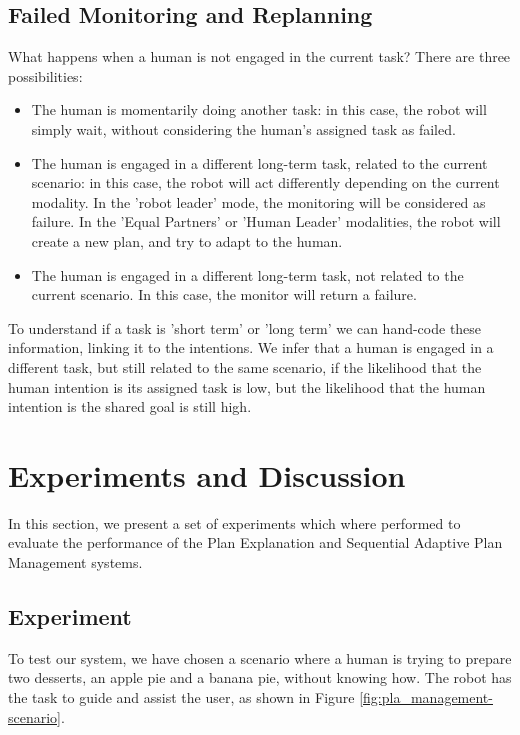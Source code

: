 \subsection{Failed Monitoring and Replanning}
What happens when a human is not engaged in the current task? There are three possibilities:
\begin{itemize}
\item The human is momentarily doing another task: in this case, the robot will simply wait, without considering the human's assigned task as failed.
\item The human is engaged in a different long-term task, related to the current scenario: in this case, the robot will act differently depending on the current modality. In the 'robot leader' mode, the monitoring will be considered as failure. In the 'Equal Partners' or 'Human Leader' modalities, the robot will create a new plan, and try to adapt to the human.  
\item The human is engaged in a different long-term task, not related to the current scenario. In this case, the monitor will return a failure.
\end{itemize}

To understand if a task is 'short term' or 'long term' we can hand-code these information, linking it to the intentions. We infer that a human is engaged in a different task, but still related to the same scenario, if the likelihood that the human intention is its assigned task is low, but the likelihood that the human intention is the shared goal is still high. 



\section{Experiments and Discussion}
\label{sec:plan_management-experiments}
In this section, we present a set of experiments which where performed to evaluate the performance of the Plan Explanation and Sequential Adaptive Plan Management systems.

 \subsection{Experiment}
 \label{sec:plan_management-experiment}
To test our system, we have chosen a scenario where a human is trying to prepare two desserts, an apple pie and a banana pie, without knowing how. The robot has the task to guide and assist the user, as shown in Figure \ref{fig:pla_management-scenario}. 

